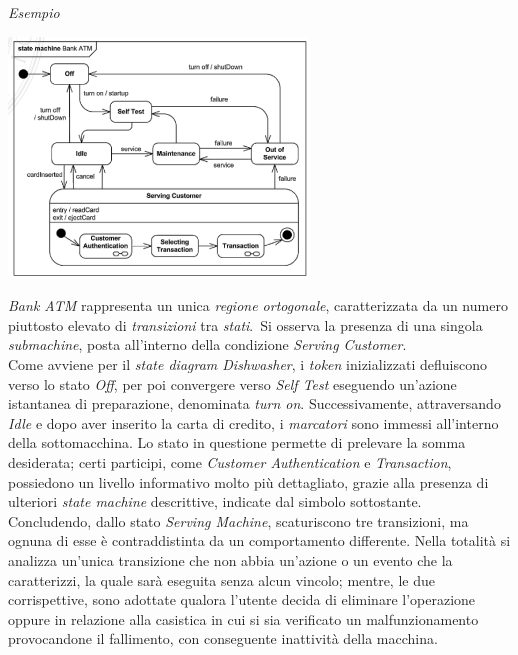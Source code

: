 \documentclass{article}
\begin{document}
\textit{Esempio}\vspace*{7pt}
\begin{center}
    \includegraphics*[width=0.6\textwidth]{foto 6.png}
\end{center}
\textit{Bank ATM} rappresenta un unica \textit{regione ortogonale}, caratterizzata da un numero piuttosto elevato di \textit{transizioni} tra \textit{stati}.\ Si osserva la presenza di una singola \textit{submachine}, posta all'interno della condizione \textit{Serving Customer}.\vspace*{14pt}\\
Come avviene per il \textit{state diagram Dishwasher}, i \textit{token} inizializzati defluiscono verso lo stato \textit{Off}, per poi convergere verso \textit{Self Test} eseguendo un'azione istantanea di preparazione, denominata \textit{turn on}. Successivamente, attraversando \textit{Idle} e dopo aver inserito la carta di credito, i \textit{marcatori} sono immessi all'interno della sottomacchina. Lo stato in questione permette di prelevare la somma desiderata; certi participi, come \textit{Customer Authentication} e  \textit{Transaction}, possiedono un livello informativo molto più dettagliato, grazie alla presenza di ulteriori \textit{state machine} descrittive, indicate dal simbolo sottostante.\vspace*{14pt}\\
Concludendo, dallo stato \textit{Serving Machine}, scaturiscono tre transizioni, ma ognuna di esse è contraddistinta da un comportamento differente. Nella totalità si analizza un'unica transizione che non abbia un'azione o un evento che la caratterizzi, la quale sarà eseguita senza alcun vincolo; mentre, le due corrispettive, sono adottate qualora l'utente decida di eliminare l'operazione oppure in relazione alla casistica in cui si sia verificato un malfunzionamento provocandone il fallimento, con conseguente inattività della macchina.
\end{document}
